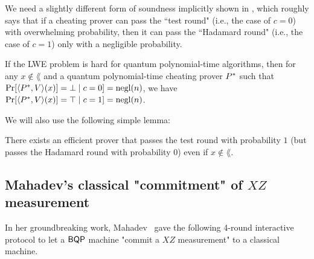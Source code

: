 We need a slightly different form of soundness implicitly shown in \cite{FOCS:Mahadev18a}, which roughly says that if a cheating prover can pass the ``test round" (i.e., the case of $c=0$) with overwhelming probability, then it can pass the ``Hadamard round" (i.e., the case of $c=1$) only with a negligible probability. 
\begin{lemma}\label{lem:Mah_soundness}
If the LWE problem is hard for quantum polynomial-time algorithms, then for any $x\notin \lang$ and a quantum polynomial-time cheating prover $P^*$ such that  $\Pr[\langle P^*,V \rangle(x)]=\bot\mid c=0]=\operatorname{negl}(n)$, we have $\Pr[\langle P^*,V \rangle(x)]=\top\mid c=1]=\operatorname{negl}(n)$.
\end{lemma}

We will also use the following simple lemma:
\begin{lemma}\label{fact:perfectly_pass_test}
There exists an efficient prover that passes the test round with probability $1$ (but passes the Hadamard round with probability $0$) even if $x\notin \lang$. 
\end{lemma}


\subsection{Mahadev's classical "commitment" of $XZ$ measurement}

In her groundbreaking work, Mahadev~\cite{mahadev_delegation} gave the following 4-round interactive protocol to let a $\operatorname{\mathsf{BQP}}$ machine "commit a $XZ$ measurement" to a classical machine. 

